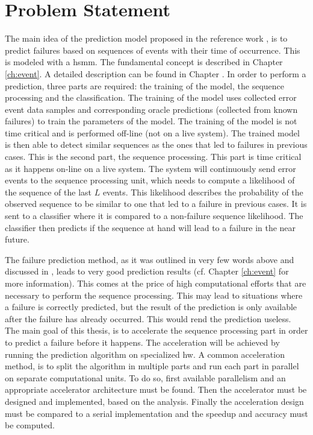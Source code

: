 \documentclass[mscthesis]{usiinfthesis}
\begin{document}
\section{Problem Statement}
\label{ch:_intro_prob}

The main idea of the prediction model proposed in the reference work
\cite{salfner08}, is to predict failures based on sequences of events with
their time of occurrence. This is modeled with a \gls{hsmm}. The fundamental
concept is described in Chapter \ref{ch:event}. A detailed description can be
found in Chapter \cite{salfner08}. In order to perform a prediction, three
parts are required: the training of the model, the sequence processing and the
classification. The training of the model uses collected error event data
samples and corresponding oracle predictions (collected from known failures) to
train the parameters of the model. The training of the model is not time
critical and is performed off-line (not on a live system). The trained model is
then able to detect similar sequences as the ones that led to failures in
previous cases. This is the second part, the sequence processing. This part is
time critical as it happens on-line on a live system. The system will
continuously send error events to the sequence processing unit, which needs to
compute a likelihood of the sequence of the last $L$ events. This likelihood
describes the probability of the observed sequence to be similar to one that
led to a failure in previous cases. It is sent to a classifier where it is
compared to a non-failure sequence likelihood. The classifier then predicts if
the sequence at hand will lead to a failure in the near future.

The failure prediction method, as it was outlined in very few words above and
discussed in \cite{salfner08}, leads to very good prediction results (cf.
Chapter \ref{ch:event} for more information). This comes at the price of high
computational efforts that are necessary to perform the sequence processing.
This may lead to situations where a failure is correctly predicted, but the
result of the prediction is only available after the failure has already
occurred. This would rend the prediction useless. The main goal of this thesis,
is to accelerate the sequence processing part in order to predict a failure
before it happens. The acceleration will be achieved by running the prediction
algorithm on specialized \gls{hw}. A common acceleration method, is to split
the algorithm in multiple parts and run each part in parallel on separate
computational units. To do so, first available parallelism and an appropriate
accelerator architecture must be found. Then the accelerator must be designed
and implemented, based on the analysis. Finally the acceleration design must
be compared to a serial implementation and the speedup and accuracy must be
computed.
\end{document}
